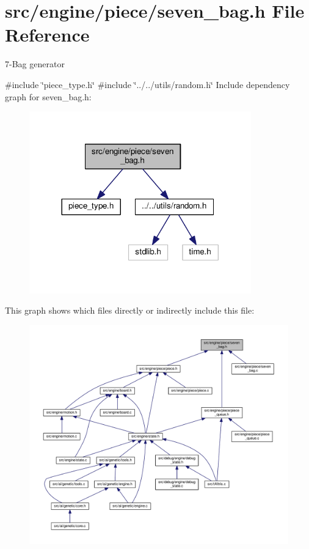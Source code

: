 \section{src/engine/piece/seven\+\_\+bag.h File Reference}
\label{seven__bag_8h}


7-\/\+Bag generator  


{\ttfamily \#include \char`\"{}piece\+\_\+type.\+h\char`\"{}}\newline
{\ttfamily \#include \char`\"{}../../utils/random.\+h\char`\"{}}\newline
Include dependency graph for seven\+\_\+bag.\+h\+:
\nopagebreak
\begin{figure}[H]
\begin{center}
\leavevmode
\includegraphics[width=272pt]{seven__bag_8h__incl}
\end{center}
\end{figure}
This graph shows which files directly or indirectly include this file\+:
\nopagebreak
\begin{figure}[H]
\begin{center}
\leavevmode
\includegraphics[width=350pt]{seven__bag_8h__dep__incl}
\end{center}
\end{figure}
